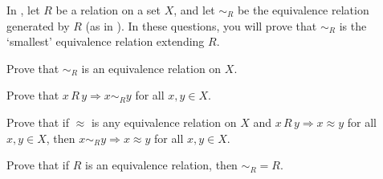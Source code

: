 In , let $R$ be a relation on a set $X$, and let $\sim_R$ be the equivalence relation generated by $R$ (as in ). In these questions, you will prove that $\sim_R$ is the `smallest' equivalence relation extending $R$.

\begin{chapex}
\label{cqPropertiesOfEquivalenceRelationGeneratedByRelationBegin}
Prove that ${\sim}_R$ is an equivalence relation on $X$.
\end{chapex}

\begin{chapex}
Prove that $x\,R\,y \Rightarrow x \sim_R y$ for all $x,y \in X$.
\end{chapex}

\begin{chapex}
Prove that if $\approx$ is any equivalence relation on $X$ and $x\,R\,y \Rightarrow x \approx y$ for all $x,y \in X$, then $x \sim_R y \Rightarrow x \approx y$ for all $x,y \in X$.
\end{chapex}

\begin{chapex}
\label{cqPropertiesOfEquivalenceRelationGeneratedByRelationEnd}
Prove that if $R$ is an equivalence relation, then ${\sim_R} = R$.
\end{chapex}